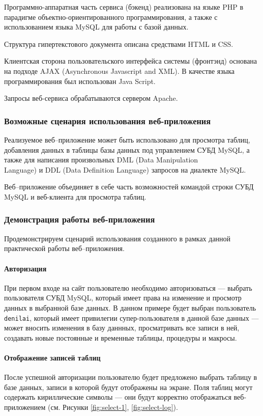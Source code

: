 \documentclass[a4paper,14pt]{extarticle}
\begin{document}
Программно-аппаратная часть сервиса (бэкенд) реализована на языке PHP в парадигме объектно-ориентированного программирования, а также с использованием языка MySQL для работы с базой данных.

Структура гипертекстового документа описана средствами HTML и CSS.

Клиентская сторона пользовательского интерфейса системы (фронтэнд) основана на подходе AJAX (Asynchronous Javascript and XML). В качестве языка программирования был использован Java Script. 

Запросы веб-сервиса обрабатываются сервером Apache.


\subsubsection*{Возможные сценария использования веб-приложения}

Реализуемое веб--приложение может быть использовано для просмотра таблиц, добавления данных в таблицы базы данных под управлением СУБД MySQL, а также для написания произвольных DML (Data Manipulation\\ Language) и DDL (Data Definition Language) запросов на диалекте MySQL. 

Веб--приложение объединяет в себе часть возможностей командой строки СУБД MySQL и веб-клиента для просмотра таблиц.


\subsubsection*{Демонстрация работы веб-приложения}

Продемонстрируем сценарий использования созданного в рамках данной практической работы веб--приложения. 

\paragraph{Авторизация}
При первом входе на сайт пользователю необходимо авторизоваться --- выбрать пользователя СУБД MySQL, который имеет права на изменение и просмотр данных в выбранной базе данных. В данном примере будет выбран пользователь \texttt{denilai}, который имеет привилегии супер-пользователя в данной базе данных --- может вносить изменения в базу даннных, просматривать все записи в ней, создавать новые постоянные и временные таблицы, процедуры и макросы.

\paragraph{Отображение записей таблиц}
После успешной авторизации пользователю будет предложено выбрать таблицу в базе данных, записи в которой будут отображены на экране. Поля таблиц могут содержать кириллические символы --- они будут корректно отображаться веб-приложением (см. Рисунки \ref{fig:select-1}, \ref{fig:select-log}).
\end{document}
